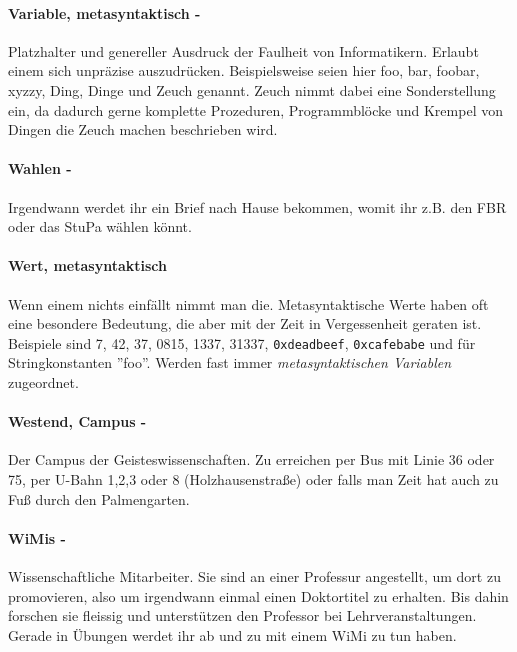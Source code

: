 \paragraph{Variable, metasyntaktisch -} Platzhalter und genereller Ausdruck der Faulheit von Informatikern. Erlaubt einem sich unpr\"azise auszudr\"ucken. Beispielsweise seien hier foo, bar, foobar, xyzzy, Ding, Dinge und Zeuch genannt. Zeuch nimmt dabei eine Sonderstellung ein, da dadurch gerne komplette Prozeduren, Programmbl\"ocke und Krempel von Dingen die Zeuch machen beschrieben wird.
\paragraph{Wahlen -} Irgendwann werdet ihr ein Brief nach Hause bekommen, womit ihr z.B. den FBR oder das StuPa wählen könnt.
\paragraph{Wert, metasyntaktisch} Wenn einem nichts einf\"allt nimmt man die. Metasyntaktische Werte haben oft eine besondere Bedeutung, die aber mit der Zeit in Vergessenheit geraten ist. Beispiele sind 7, 42, 37, 0815, 1337, 31337, \texttt{0xdeadbeef}, \texttt{0xcafebabe} und f\"ur Stringkonstanten ''foo''. Werden fast immer \textit{metasyntaktischen Variablen} zugeordnet.
\paragraph{Westend, Campus -} Der Campus der Geisteswissenschaften. Zu erreichen per Bus mit Linie 36 oder 75, per U-Bahn 1,2,3 oder 8 (Holzhausenstraße) oder falls man Zeit hat auch zu Fuß durch den Palmengarten.
\paragraph{WiMis -} Wissenschaftliche Mitarbeiter. Sie sind an einer Professur angestellt, um dort zu promovieren, also um irgendwann einmal einen Doktortitel zu erhalten. Bis dahin forschen sie fleissig und unterstützen den Professor bei Lehrveranstaltungen. Gerade in Übungen werdet ihr ab und zu mit einem WiMi zu tun haben.
\spaltenende

